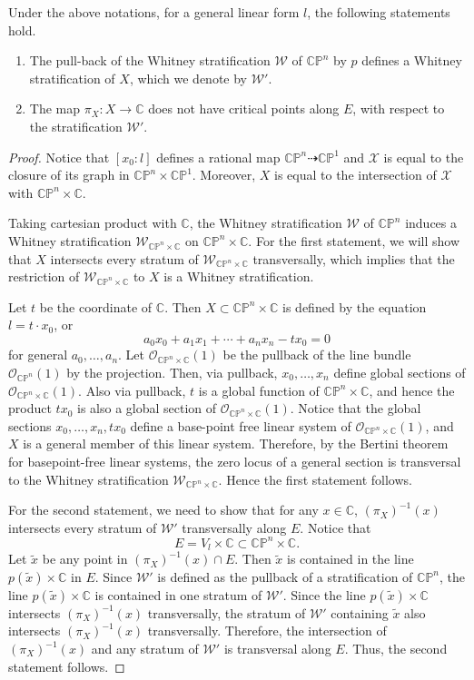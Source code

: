\documentclass[10pt,a4paper]{amsart}
\newcommand{\CP}{\mathbb{CP}}
\newcommand{\C}{\mathbb{C}}
\newcommand{\cX}{\mathcal{X}}
\begin{document}
\begin{prop}\label{propA}
Under the above notations, for a general linear form $l$, the following statements hold.
\begin{enumerate}
\item The pull-back of the Whitney stratification $\mathcal{W}$ of $\CP^n$ by $p$ defines a Whitney stratification of $X$, which we denote by $\mathcal{W}'$. 
\item The map $\pi_X\colon X\to \C$ does not have critical points along $E$, with respect to the stratification $\mathcal{W}'$. 
\end{enumerate}
\end{prop}

\begin{proof}
Notice that $[x_0:l]$ defines a rational map $\CP^n\dashrightarrow \CP^1$ and $\cX$ is equal to the closure of its graph in $\CP^n\times \CP^1$. Moreover, $X$ is equal to the intersection of $\cX$ with $\CP^n\times \C$. 

Taking cartesian product with $\C$, the Whitney stratification $\mathcal{W}$ of $\CP^n$ induces a Whitney stratification $\mathcal{W}_{\CP^n\times \C}$ on $\CP^n\times \C$. For the first statement, we will show that $X$ intersects every stratum of $\mathcal{W}_{\CP^n\times \C}$ transversally, which implies that the restriction of $\mathcal{W}_{\CP^n\times \C}$ to $X$ is a Whitney stratification. 

Let $t$ be the coordinate of $\C$. Then $X \subset \CP^n\times \C$ is defined by the equation $l=t \cdot x_0$, or
\[
a_0x_0+a_1x_1+\cdots +a_nx_n-t x_0=0
\]
for general $a_0, \dots, a_n$. Let $\mathcal{O}_{\CP^n\times \C}(1)$ be the pullback of the line bundle $\mathcal{O}_{\CP^n}(1)$ by the projection. Then, via pullback, $x_0, \dots, x_n$ define global sections of $\mathcal{O}_{\CP^n\times \C}(1)$. Also via pullback, $t$ is a global function of $\CP^n\times \C$, and hence the product $t x_0$ is also a global section of $\mathcal{O}_{\CP^n\times \C}(1)$. Notice that the global sections $x_0, \dots, x_n, tx_0$ define a base-point free linear system of $\mathcal{O}_{\CP^n\times \C}(1)$, and $X$ is  a general member of this linear system. Therefore, by the Bertini theorem for basepoint-free linear systems, the zero locus of a general section is transversal to the Whitney stratification $\mathcal{W}_{\CP^n\times \C}$. Hence the first statement follows. 

For the second statement, we need to show that for any $x\in \C$, $(\pi_X)^{-1}(x)$ intersects every stratum of $\mathcal{W}'$ transversally along $E$. Notice that 
\[
E= V_l\times \C\subset \CP^n\times \C.
\]
Let $\tilde{x}$ be any point in $(\pi_X)^{-1}(x)\cap E$. Then $\tilde{x}$ is contained in the line $p(\tilde{x})\times \C$ in $E$. Since $\mathcal{W}'$ is defined as the pullback of a stratification of $\CP^n$, the line $p(\tilde{x})\times \C$ is contained in one stratum of $\mathcal{W}'$. Since the line $p(\tilde{x})\times \C$ intersects $(\pi_X)^{-1}(x)$ transversally, the stratum of $\mathcal{W}'$ containing $\tilde{x}$ also intersects $(\pi_X)^{-1}(x)$ transversally. Therefore, the intersection of  $(\pi_X)^{-1}(x)$ and any stratum of $\mathcal{W}'$ is transversal along $E$. Thus, the second statement follows. 
\end{proof}
\end{document}
